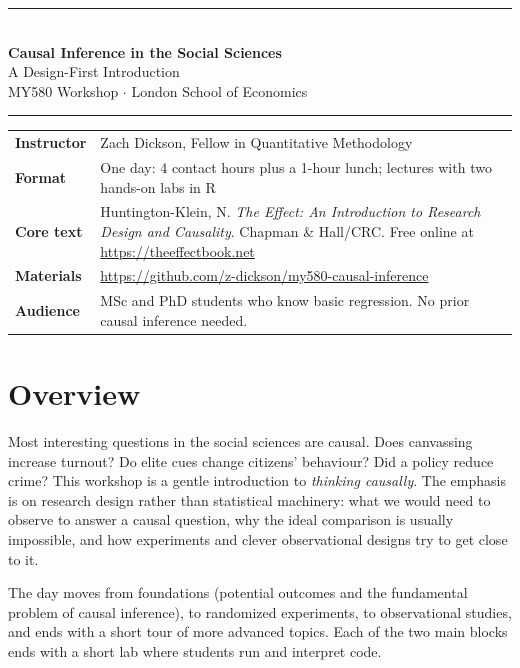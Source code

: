 \documentclass[11pt,a4paper]{article}
\begin{document}
\begin{center}
  {\color{lsenavy}\rule{\textwidth}{1.2pt}}\\[0.8em]
  {\LARGE\bfseries\color{lsenavy} Causal Inference in the Social Sciences}\\[0.3em]
  {\large A Design-First Introduction}\\[0.6em]
  {\color{midgrey} MY580 Workshop $\cdot$ London School of Economics}\\[0.8em]
  {\color{lsenavy}\rule{\textwidth}{1.2pt}}
\end{center}

\vspace{0.6em}
\noindent
\begin{tabularx}{\textwidth}{@{}l X@{}}
  \textbf{Instructor} & Zach Dickson, Fellow in Quantitative Methodology \\
  \textbf{Format}     & One day: 4 contact hours plus a 1-hour lunch; lectures with two hands-on labs in R \\
  \textbf{Core text}  & Huntington-Klein, N. \emph{The Effect: An Introduction to Research Design and Causality}. Chapman \& Hall/CRC. Free online at \url{https://theeffectbook.net} \\
  \textbf{Materials}  & \url{https://github.com/z-dickson/my580-causal-inference} \\
  \textbf{Audience}   & MSc and PhD students who know basic regression. No prior causal inference needed. \\
\end{tabularx}

\section{Overview}

Most interesting questions in the social sciences are causal. Does canvassing increase turnout?
Do elite cues change citizens' behaviour? Did a policy reduce crime? This workshop is a gentle introduction
to \emph{thinking causally}. The emphasis is on research design rather than statistical machinery: what
we would need to observe to answer a causal question, why the ideal comparison is usually
impossible, and how experiments and clever observational designs try to get close to it.

The day moves from foundations (potential outcomes and the fundamental problem of causal inference),
to randomized experiments, to observational studies, and ends with a short tour of more advanced
topics. Each of the two main blocks ends with a short lab where students run and interpret code.
\end{document}
